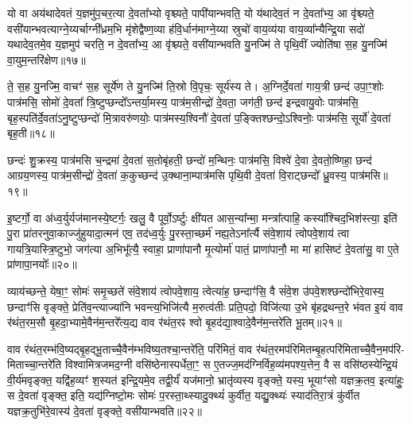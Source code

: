 {\anuvakamend[{व्यावृ॑त्त्या अ॒भितो॑ व॒पां पञ्च॑ च॥५॥}]}

यो वा अय॑थादेवतं य॒ज्ञमु॑प॒चर॒त्या दे॒वता᳚भ्यो वृश्च्यते॒ पापी॑यान्भवति॒ यो य॑थादेव॒तं न दे॒वता᳚भ्य॒ आ वृ॑श्च्यते॒ वसी॑यान्भवत्याग्ने॒य्यर्चाग्नी᳚ध्रम॒भि मृ॑शेद्वैष्ण॒व्या ह॑वि॒र्धान॑माग्ने॒य्या स्रुचो॑ वाय॒व्य॑या वाय॒व्या᳚न्यैन्द्रि॒या सदो॑ यथादेव॒तमे॒व य॒ज्ञमुप॑ चरति॒ न दे॒वता᳚भ्य॒ आ वृ॑श्च्यते॒ वसी॑यान्भवति यु॒नज्मि॑ ते पृथि॒वीं ज्योति॑षा स॒ह यु॒नज्मि॑ वा॒युम॒न्तरि॑क्षेण॥१७॥

ते॒ स॒ह यु॒नज्मि॒ वाचꣳ॑ स॒ह सूर्ये॑ण ते यु॒नज्मि॑ ति॒स्रो वि॒पृचः॒ सूर्य॑स्य ते। अ॒ग्निर्दे॒वता॑ गाय॒त्री छन्द॑ उपा॒ꣳ॒शोः पात्र॑मसि॒ सोमो॑ दे॒वता᳚ त्रि॒ष्टुप्छन्दो᳚\-ऽन्तर्या॒मस्य॒ पात्र॑म॒सीन्द्रो॑ दे॒वता॒ जग॑ती॒ छन्द॑ इन्द्रवायु॒वोः पात्र॑मसि॒ बृह॒स्पति॑र्दे॒वता॑\-ऽनु॒ष्टुप्छन्दो॑ मि॒त्रावरु॑णयोः॒ पात्र॑मस्य॒श्विनौ॑ दे॒वता॑ प॒ङ्क्तिश्छन्दो॒\-ऽश्विनोः॒ पात्र॑मसि॒ सूर्यो॑ दे॒वता॑ बृह॒ती॥१८॥

छन्दः॑ शु॒क्रस्य॒ पात्र॑मसि च॒न्द्रमा॑ दे॒वता॑ स॒तोबृ॑हती॒ छन्दो॑ म॒न्थिनः॒ पात्र॑मसि॒ विश्वे॑ दे॒वा दे॒वतो॒ष्णिहा॒ छन्द॑ आग्रय॒णस्य॒ पात्र॑म॒सीन्द्रो॑ दे॒वता॑ क॒कुच्छन्द॑ उ॒क्थाना॒म्पात्र॑मसि पृथि॒वी दे॒वता॑ वि॒राट्छन्दो᳚ ध्रु॒वस्य॒ पात्र॑मसि॥१९॥

{\anuvakamend[{अ॒न्तरि॑क्षेण बृह॒ती त्रय॑स्त्रिꣳशच्च॥६॥}]}

इ॒ष्टर्गो॒ वा अ॑ध्व॒र्युर्यज॑मानस्ये॒ष्टर्गः॒ खलु॒ वै पूर्वो॒\-ऽर्ष्टुः क्षी॑यत आस॒न्या᳚न्मा॒ मन्त्रा᳚त्पाहि॒ कस्या᳚श्चिद॒भिश॑स्त्या॒ इति॑ पु॒रा प्रा॑तरनुवा॒काज्जु॑हुयादा॒त्मन॑ एव॒ तद॑ध्व॒र्युः पु॒रस्ता॒च्छर्म॑ नह्य॒ते\-ऽना᳚र्त्यै संवे॒शाय॑ त्वोपवे॒शाय॑ त्वा गायत्रि॒यास्त्रि॒ष्टुभो॒ जग॑त्या अ॒भिभू᳚त्यै॒ स्वाहा॒ प्राणा॑पानौ मृ॒त्योर्मा॑ पातं॒ प्राणा॑पानौ॒ मा मा॑ हासिष्टं दे॒वता॑सु॒ वा ए॒ते प्रा॑णापा॒नयोः᳚॥२०॥

व्याय॑च्छन्ते॒ येषा॒ꣳ॒ सोमः॑ समृ॒च्छते॑ संवे॒शाय॑ त्वोपवे॒शाय॒ त्वेत्या॑ह॒ छन्दाꣳ॑सि॒ वै सं॑वे॒श उ॑पवे॒शश्छन्दो॑भिरे॒वास्य॒ छन्दाꣳ॑सि वृङ्क्ते॒ प्रेति॑व॒न्त्याज्या॑नि भवन्त्य॒भिजि॑त्यै म॒रुत्व॑तीः प्रति॒पदो॒ विजि॑त्या उ॒भे बृ॑हद्रथन्त॒रे भ॑वत इ॒यं वाव र॑थंत॒रम॒सौ बृ॒हदा॒भ्यामे॒वैन॑म॒न्तरे᳚त्य॒द्य वाव र॑थंत॒रꣴ श्वो बृ॒हद॑द्या॒श्वादे॒वैन॑म॒न्तरे॑ति भू॒तम्॥२१॥

वाव र॑थंत॒रम्भ॑वि॒ष्यद्बृ॒हद्भू॒ताच्चै॒वैन॑म्भविष्य॒तश्चा॒न्तरे॑ति॒ परि॑मितं॒ वाव र॑थंत॒रमप॑रिमितम्बृ॒हत्परि॑मिताच्चै॒वैन॒मप॑रि- मिताच्चा॒न्तरे॑ति विश्वामित्रजमद॒ग्नी वसि॑ष्ठेनास्पर्धेता॒ꣳ॒ स ए॒तज्ज॒मद॑ग्निर्विह॒व्य॑मपश्य॒त्तेन॒ वै स वसि॑ष्ठस्येन्द्रि॒यं वी॒र्य॑मवृङ्क्त॒ यद्वि॑ह॒व्यꣳ॑ श॒स्यत॑ इन्द्रि॒यमे॒व तद्वी॒र्यं॑ यज॑मानो॒ भ्रातृ॑व्यस्य वृङ्क्ते॒ यस्य॒ भूयाꣳ॑सो यज्ञक्र॒तव॒ इत्या॑हुः॒ स दे॒वता॑ वृङ्क्त॒ इति॒ यद्य॑ग्निष्टो॒मः सोमः॑ प॒रस्ता॒थ्स्यादु॒क्थ्यं॑ कुर्वीत॒ यद्यु॒क्थ्यः॑ स्याद॑तिरा॒त्रं कु॑र्वीत यज्ञक्र॒तुभि॑रे॒वास्य॑ दे॒वता॑ वृङ्क्ते॒ वसी॑यान्भवति॥२२॥

